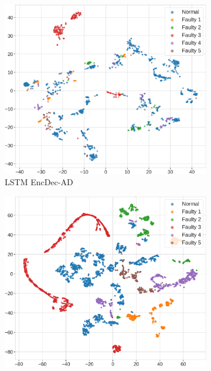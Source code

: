 \documentclass{article}
\begin{document}
\begin{figure}[t]
    \centering
    \begin{subfigure}[b]{0.32\textwidth}
        \centering
        \includegraphics[width=\textwidth]{figures/tsne_lstm_autoencoder.png}
        \caption{LSTM EncDec-AD}\label{fig:tsne_lstm}
    \end{subfigure}
    \hfill
    \begin{subfigure}[b]{0.32\textwidth}
        \centering
        \includegraphics[width=\textwidth]{figures/tsne_patchtrad.png}

\end{subfigure}
\end{figure}
\end{document}
